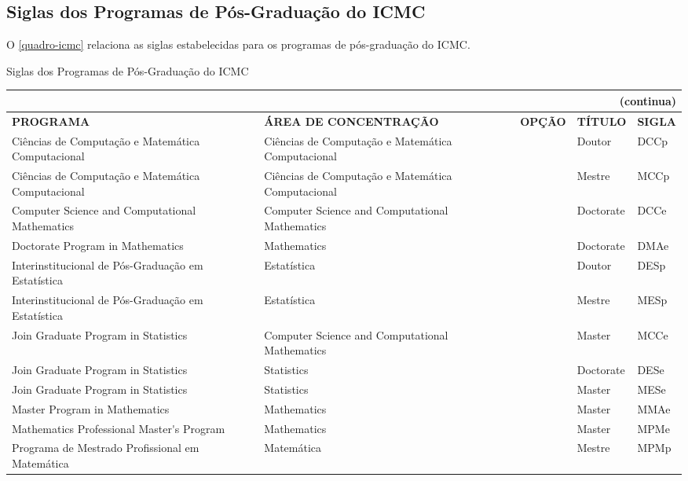 \begin{apendicesenv}
\chapter{Siglas dos Programas de Pós-Graduação do ICMC}
O \autoref{quadro-icmc} relaciona as siglas estabelecidas para os programas de pós-graduação do ICMC.
\begin{quadro}[htb]
\ABNTEXfontereduzida
\caption[Siglas dos Programas de Pós-Graduação do ICMC]{Siglas dos Programas de Pós-Graduação do ICMC}
\label{quadro-icmc}
\begin{tabular}{|p{3.5cm}|p{3.5cm}|p{2.5cm}|p{2.5cm}|p{2.25cm}|}
  \multicolumn{5}{r}{{(continua)}} \\ 
  \hline
   \textbf{PROGRAMA} & \textbf{ÁREA DE CONCENTRAÇÃO} & \textbf{OPÇÃO} & \textbf{TÍTULO} & \textbf{SIGLA}  \\
    \hline
		Ciências de Computação e Matemática Computacional	& Ciências de Computação e Matemática Computacional	&   &	Doutor	 & DCCp\\
    Ciências de Computação e Matemática Computacional	& Ciências de Computação e Matemática Computacional	&   &	Mestre	& MCCp\\
		Computer Science and Computational Mathematics & Computer Science and Computational Mathematics	&   &	Doctorate & DCCe\\
		Doctorate Program in Mathematics & Mathematics &   &	Doctorate & DMAe\\
		Interinstitucional de Pós-Graduação em Estatística & Estatística &  & Doutor	 & DESp\\
		Interinstitucional de Pós-Graduação em Estatística & Estatística &  & Mestre & MESp\\
		Join Graduate Program in Statistics & Computer Science and Computational Mathematics &  & Master & MCCe\\
		Join Graduate Program in Statistics & Statistics &  & Doctorate & 	DESe\\
    Join Graduate Program in Statistics & Statistics &  & Master & MESe\\
		Master Program in Mathematics &	Mathematics &  & Master &	MMAe\\
		Mathematics Professional Master\'{}s Program &	Mathematics &	 & Master &	MPMe\\
		Programa de Mestrado Profissional em Matemática & Matemática &  & Mestre & MPMp\\
		\end{tabular}
\end{quadro}


\end{apendicesenv}
